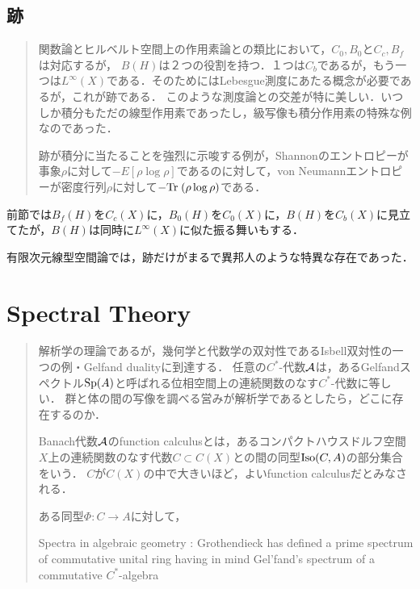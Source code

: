 \documentclass[uplatex,dvipdfmx]{jsreport}
\begin{document}
\section{跡}

\begin{quotation}
    関数論とヒルベルト空間上の作用素論との類比において，$C_0,B_0$と$C_c,B_f$は対応するが，
    $B(H)$は２つの役割を持つ．１つは$C_b$であるが，もう一つは$L^\infty(X)$である．そのためにはLebesgue測度にあたる概念が必要であるが，これが跡である．
    このような測度論との交差が特に美しい．いつしか積分もただの線型作用素であったし，級写像も積分作用素の特殊な例なのであった．

    跡が積分に当たることを強烈に示唆する例が，Shannonのエントロピーが事象$\rho$に対して$-E[\rho\log\rho]$であるのに対して，von Neumannエントロピーが密度行列$\rho$に対して$-\mathrm{Tr}\;(\rho\log\rho)$である．
\end{quotation}

\begin{tcolorbox}[colframe=ForestGreen, colback=ForestGreen!10!white,breakable,colbacktitle=ForestGreen!40!white,coltitle=black,fonttitle=\bfseries\sffamily,
title=]
    前節では$B_f(H)$を$C_c(X)$に，$B_0(H)$を$C_0(X)$に，$B(H)$を$C_b(X)$に見立てたが，$B(H)$は同時に$L^\infty(X)$に似た振る舞いもする．

    有限次元線型空間論では，跡だけがまるで異邦人のような特異な存在であった．
\end{tcolorbox}



\chapter{Spectral Theory}

\begin{quotation}
    解析学の理論であるが，幾何学と代数学の双対性であるIsbell双対性の一つの例・Gelfand dualityに到達する．
    任意の$C^*$-代数$\mathcal{A}$は，あるGelfandスペクトル$\mathrm{Sp}(A)$と呼ばれる位相空間上の連続関数のなす$C^*$-代数に等しい．
    群と体の間の写像を調べる営みが解析学であるとしたら，どこに存在するのか．

    Banach代数$\mathcal{A}$のfunction calculusとは，あるコンパクトハウスドルフ空間$X$上の連続関数のなす代数$C\subset C(X)$との間の同型$\mathrm{Iso}(C,A)$の部分集合をいう．
    $C$が$C(X)$の中で大きいほど，よいfunction calculusだとみなされる．

    ある同型$\Phi:C\to A$に対して，

    Spectra in algebraic geometry : 
    Grothendieck has defined a prime spectrum of commutative unital ring having in mind Gel'fand's spectrum of a commutative $C^*$-algebra
\end{quotation}
\end{document}
